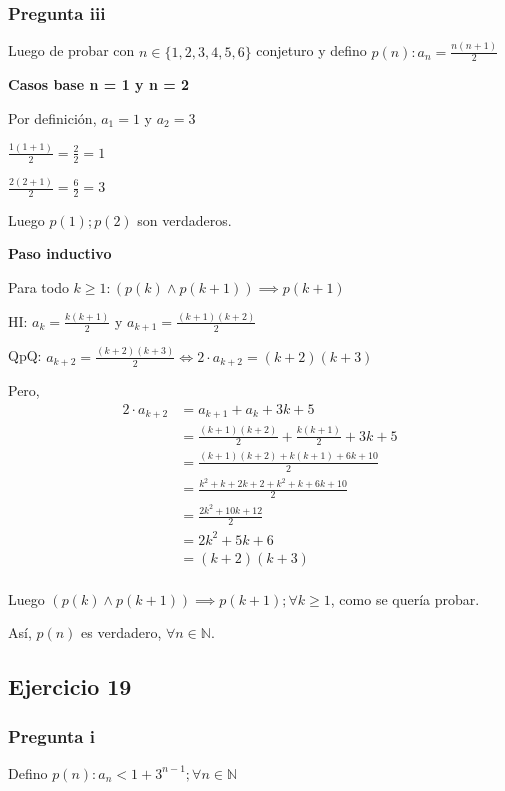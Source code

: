 \subsubsection{Pregunta iii}

Luego de probar con $ n \in \{ 1,2,3,4,5,6 \} $ conjeturo y defino $ p(n): a_n = \frac{n(n+1)}{2} $

\textbf{Casos base n = 1 y n = 2}

Por definición, $a_1 = 1$ y $a_2 = 3$

$ \frac{1(1+1)}{2} = \frac{2}{2} = 1$

$ \frac{2(2+1)}{2} = \frac{6}{2} = 3$

Luego $ p(1); p(2) $ son verdaderos.

\textbf{Paso inductivo}

Para todo $k \geq 1: (p(k) \wedge p(k+1)) \implies p(k+1)$

HI: $ a_k = \frac{k(k+1)}{2} $ y $ a_{k+1} = \frac{(k+1)(k+2)}{2} $

QpQ: $ a_{k+2} = \frac{(k+2)(k+3)}{2} \iff 2\cdot a_{k+2} = (k+2)(k+3) $

Pero,
\begin{align*}
    2\cdot a_{k+2} &= a_{k+1} + a_k + 3k + 5 \\
    &= \frac{(k+1)(k+2)}{2} + \frac{k(k+1)}{2} + 3k + 5 \\
    &= \frac{(k+1)(k+2) + k(k+1) + 6k + 10}{2}\\
    &= \frac{k^2 + k + 2k + 2 + k^2 + k + 6k + 10}{2}\\
    &= \frac{2k^2 + 10k + 12}{2}\\
    &= 2k^2 + 5k + 6\\
    &= (k+2)(k+3)\\
\end{align*}

Luego $(p(k) \wedge p(k+1)) \implies p(k+1); \forall k \geq 1$, como se quería probar.

Así, $p(n)$ es verdadero, $\forall n \in \mathbb{N}$.

\subsection{Ejercicio 19}

\subsubsection{Pregunta i}

Defino $ p(n): a_n < 1 + 3^{n-1}; \forall n \in \mathbb{N}$

